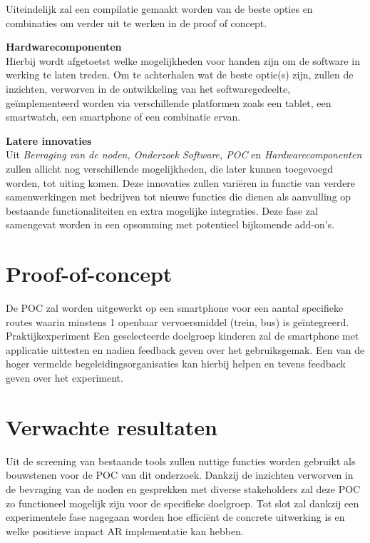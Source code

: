 \documentclass{hogent-article}
\begin{document}
    Uiteindelijk zal een compilatie gemaakt worden van de beste opties en combinaties om verder uit te werken in de proof of concept.
    
    \textbf{Hardwarecomponenten} \\
    
    Hierbij wordt afgetoetst welke mogelijkheden voor handen zijn om de software in werking te laten treden. Om te achterhalen wat de beste optie(s) zijn, zullen de inzichten, verworven in de ontwikkeling van het softwaregedeelte, geïmplementeerd worden via verschillende platformen zoals een tablet, een smartwatch, een smartphone of een combinatie ervan.
    
    \textbf{Latere innovaties} \\
    
    Uit \emph{Bevraging van de noden, Onderzoek Software, POC} en \emph{Hardwarecomponenten} zullen allicht nog verschillende mogelijkheden, die later kunnen toegevoegd worden, tot uiting komen. Deze innovaties zullen variëren in functie van verdere samenwerkingen met bedrijven tot nieuwe functies die dienen als aanvulling op bestaande functionaliteiten en extra mogelijke integraties. Deze fase zal samengevat worden in een opsomming met potentieel bijkomende add-on's.
    
    \section{Proof-of-concept}%
    \label{sec:proof-of-concept}
    De POC zal worden uitgewerkt op een smartphone voor een aantal specifieke routes waarin minstens 1 openbaar vervoersmiddel (trein, bus) is geïntegreerd.
    Praktijkexperiment
    Een geselecteerde doelgroep kinderen zal de smartphone met applicatie uittesten en nadien feedback geven over het gebruiksgemak. Een van de hoger vermelde begeleidingsorganisaties kan hierbij helpen en tevens feedback geven over het experiment.



    \section{Verwachte resultaten}%
    \label{sec:verwachte-resultaten}
    
    Uit de screening van bestaande tools zullen nuttige functies worden gebruikt als bouwstenen voor de POC van dit onderzoek. Dankzij de inzichten verworven in de bevraging van de noden en gesprekken met diverse stakeholders zal deze POC zo functioneel mogelijk zijn voor de specifieke doelgroep. Tot slot zal dankzij een experimentele fase nagegaan worden hoe efficiënt de concrete uitwerking is en welke positieve impact AR implementatie kan hebben.
    
\end{document}
